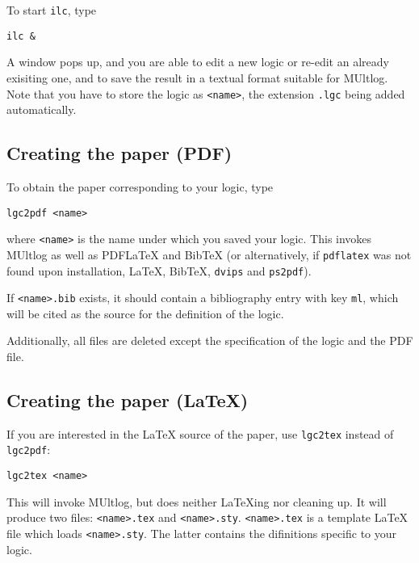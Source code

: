 \documentclass[
]{article}
\newcommand{\passthrough}[1]{#1}
\begin{document}
To start \passthrough{\lstinline!ilc!}, type

\begin{lstlisting}
ilc &
\end{lstlisting}

A window pops up, and you are able to edit a new logic or re-edit an
already exisiting one, and to save the result in a textual format
suitable for MUltlog. Note that you have to store the logic as
\passthrough{\lstinline!<name>!}, the extension
\passthrough{\lstinline!.lgc!} being added automatically.

\hypertarget{creating-the-paper-pdf}{%
\subsection{Creating the paper (PDF)}\label{creating-the-paper-pdf}}

To obtain the paper corresponding to your logic, type

\begin{lstlisting}
lgc2pdf <name>
\end{lstlisting}

where \passthrough{\lstinline!<name>!} is the name under which you saved
your logic. This invokes MUltlog as well as PDFLaTeX and BibTeX (or
alternatively, if \passthrough{\lstinline!pdflatex!} was not found upon
installation, LaTeX, BibTeX, \passthrough{\lstinline!dvips!} and
\passthrough{\lstinline!ps2pdf!}).

If \passthrough{\lstinline!<name>.bib!} exists, it should contain a
bibliography entry with key \passthrough{\lstinline!ml!}, which will be
cited as the source for the definition of the logic.

Additionally, all files are deleted except the specification of the
logic and the PDF file.

\hypertarget{creating-the-paper-latex}{%
\subsection{Creating the paper (LaTeX)}\label{creating-the-paper-latex}}

If you are interested in the LaTeX source of the paper, use
\passthrough{\lstinline!lgc2tex!} instead of
\passthrough{\lstinline!lgc2pdf!}:

\begin{lstlisting}
lgc2tex <name>
\end{lstlisting}

This will invoke MUltlog, but does neither LaTeXing nor cleaning up. It
will produce two files: \passthrough{\lstinline!<name>.tex!} and
\passthrough{\lstinline!<name>.sty!}.
\passthrough{\lstinline!<name>.tex!} is a template LaTeX file which
loads \passthrough{\lstinline!<name>.sty!}. The latter contains the
difinitions specific to your logic.
\end{document}

